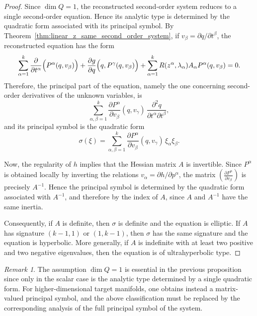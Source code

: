 \documentclass[11pt,a4paper]{article}
\theoremstyle{plain} \newtheorem{theorem}{Theorem}[section] \newtheorem{proposition}[theorem]{Proposition} \newtheorem{corollary}[theorem]{Corollary} \newtheorem{lemma}[theorem]{Lemma} \theoremstyle{definition} \newtheorem{definition}[theorem]{Definition} \theoremstyle{remark} \newtheorem{remark}[theorem]{Remark} \newtheorem{example}[theorem]{Example} %
\begin{document}
\begin{proof}
Since \(\dim Q=1\), the reconstructed second-order system reduces to a single second-order equation. Hence its analytic type is determined by the quadratic form associated with its principal symbol. By Theorem~\ref{thm:linear_z_same_second_order_system}, if \(v_\beta=\partial q/\partial t^\beta\), the reconstructed equation has the form
\[
\sum_{\alpha=1}^k \frac{\partial}{\partial t^\alpha}\Bigl(P^\alpha(q,v_\beta)\Bigr)
+\frac{\partial g}{\partial q}\Bigl(q,P^\gamma(q,v_\beta)\Bigr)
+\sum_{\alpha=1}^k R(z^\alpha,\lambda_\alpha)A_\alpha P^\alpha(q,v_\beta)=0.
\]
Therefore, the principal part of the equation, namely the one concerning second-order derivatives of the unknown variables, is
\[
\sum_{\alpha,\beta=1}^k \frac{\partial P^\alpha}{\partial v_\beta}(q,v_\gamma)\,
\frac{\partial^2 q}{\partial t^\alpha\partial t^\beta},
\]
and its principal symbol is the quadratic form
\[
\sigma(\xi)=\sum_{\alpha,\beta=1}^k \frac{\partial P^\alpha}{\partial v_\beta}(q,v_\gamma)\,\xi_\alpha\xi_\beta.
\]

Now, the regularity of \(h\) implies that the Hessian matrix
$A$
is invertible. Since \(P^\alpha\) is obtained locally by inverting the relations \(v_\alpha=\partial h/\partial p^\alpha\), the matrix
\(
\left(\frac{\partial P^\alpha}{\partial v_\beta}\right)
\)
is precisely \(A^{-1}\). Hence the principal symbol is determined by the quadratic form associated with \(A^{-1}\), and therefore by the index of \(A\), since \(A\) and \(A^{-1}\) have the same inertia.

Consequently, if \(A\) is definite, then \(\sigma\) is definite and the equation is elliptic. If \(A\) has signature \((k-1,1)\) or \((1,k-1)\), then \(\sigma\) has the same signature and the equation is hyperbolic. More generally, if \(A\) is indefinite with at least two positive and two negative eigenvalues, then the equation is of ultrahyperbolic type.  


\end{proof}

\begin{remark}
    The assumption \(\dim Q=1\) is essential in the previous proposition since only in the scalar case is the analytic type determined by a single quadratic form. For higher-dimensional target manifolds, one obtains instead a matrix-valued principal symbol, and the above classification must be replaced by the corresponding analysis of the full principal symbol of the system.
\end{remark}
\end{document}
